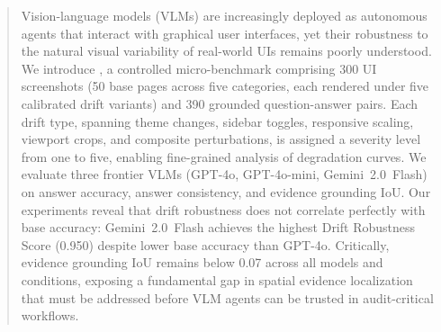 \begin{abstract}
Vision-language models (VLMs) are increasingly deployed as autonomous agents that interact with graphical user interfaces, yet their robustness to the natural visual variability of real-world UIs remains poorly understood. We introduce \bench{}, a controlled micro-benchmark comprising 300 UI screenshots (50 base pages across five categories, each rendered under five calibrated drift variants) and 390 grounded question-answer pairs. Each drift type, spanning theme changes, sidebar toggles, responsive scaling, viewport crops, and composite perturbations, is assigned a severity level from one to five, enabling fine-grained analysis of degradation curves. We evaluate three frontier VLMs (GPT-4o, GPT-4o-mini, Gemini~2.0~Flash) on answer accuracy, answer consistency, and evidence grounding IoU. Our experiments reveal that drift robustness does not correlate perfectly with base accuracy: Gemini~2.0~Flash achieves the highest Drift Robustness Score (0.950) despite lower base accuracy than GPT-4o. Critically, evidence grounding IoU remains below 0.07 across all models and conditions, exposing a fundamental gap in spatial evidence localization that must be addressed before VLM agents can be trusted in audit-critical workflows.
\end{abstract}
